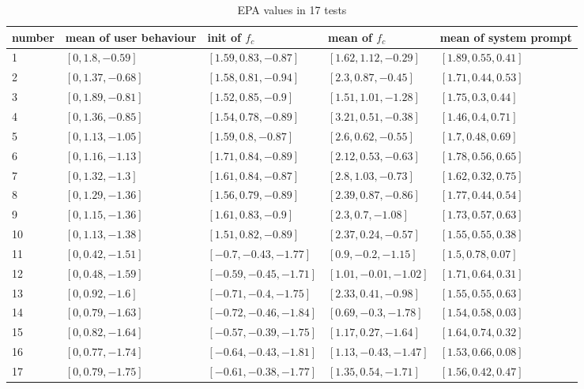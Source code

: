 %
\begin{table}\small
\centering
\caption{EPA values in 17 tests}
\label{table:compare-epa-all}
\begin{tabular}{|  p{1.2cm} | p{2.6cm} |  p{3.5cm} |  p{3.4cm} |  p{3.0cm} |}
\hline
number & mean of user behaviour & init of $f_c$ & mean of $f_c$ & mean of system prompt \\ \hline
1 & $[0, 1.8, -0.59]$ & $[1.59, 0.83, -0.87]$ & $[1.62, 1.12, -0.29]$ & $[1.89, 0.55, 0.41]$ \\ \hline
2 & $[0, 1.37, -0.68]$ & $[1.58, 0.81, -0.94]$ & $[2.3, 0.87, -0.45]$ & $[1.71, 0.44, 0.53]$ \\ \hline
3 & $[0, 1.89, -0.81]$ & $[1.52, 0.85, -0.9]$ & $[1.51, 1.01, -1.28]$ & $[1.75, 0.3, 0.44]$ \\ \hline
4 & $[0, 1.36, -0.85]$ & $[1.54, 0.78, -0.89]$ & $[3.21, 0.51, -0.38]$ & $[1.46, 0.4, 0.71]$ \\ \hline
5 & $[0, 1.13, -1.05]$ & $[1.59, 0.8, -0.87]$ & $[2.6, 0.62, -0.55]$ & $[1.7, 0.48, 0.69]$ \\ \hline
6 & $[0, 1.16, -1.13]$ & $[1.71, 0.84, -0.89]$ & $[2.12, 0.53, -0.63]$ & $[1.78, 0.56, 0.65]$ \\ \hline
7 & $[0, 1.32, -1.3]$ & $[1.61, 0.84, -0.87]$ & $[2.8, 1.03, -0.73]$ & $[1.62, 0.32, 0.75]$ \\ \hline
8 & $[0, 1.29, -1.36]$ & $[1.56, 0.79, -0.89]$ & $[2.39, 0.87, -0.86]$ & $[1.77, 0.44, 0.54]$ \\ \hline
9 & $[0, 1.15, -1.36]$ & $[1.61, 0.83, -0.9]$ & $[2.3, 0.7, -1.08]$ & $[1.73, 0.57, 0.63]$ \\ \hline
10 & $[0, 1.13, -1.38]$ & $[1.51, 0.82, -0.89]$ & $[2.37, 0.24, -0.57]$ & $[1.55, 0.55, 0.38]$ \\ \hline
11 & $[0, 0.42, -1.51]$ & $[-0.7, -0.43, -1.77]$ & $[0.9, -0.2, -1.15]$ & $[1.5, 0.78, 0.07]$ \\ \hline
12 & $[0, 0.48, -1.59]$ & $[-0.59, -0.45, -1.71]$ & $[1.01, -0.01, -1.02]$ & $[1.71, 0.64, 0.31]$ \\ \hline
13 & $[0, 0.92, -1.6]$ & $[-0.71, -0.4, -1.75]$ & $[2.33, 0.41, -0.98]$ & $[1.55, 0.55, 0.63]$ \\ \hline
14 & $[0, 0.79, -1.63]$ & $[-0.72, -0.46, -1.84]$ & $[0.69, -0.3, -1.78]$ & $[1.54, 0.58, 0.03]$ \\ \hline
15 & $[0, 0.82, -1.64]$ & $[-0.57, -0.39, -1.75]$ & $[1.17, 0.27, -1.64]$ & $[1.64, 0.74, 0.32]$ \\ \hline
16 & $[0, 0.77, -1.74]$ & $[-0.64, -0.43, -1.81]$ & $[1.13, -0.43, -1.47]$ & $[1.53, 0.66, 0.08]$ \\ \hline
17 & $[0, 0.79, -1.75]$ & $[-0.61, -0.38, -1.77]$ & $[1.35, 0.54, -1.71]$ & $[1.56, 0.42, 0.47]$ \\ \hline
\end{tabular}
\end{table}

